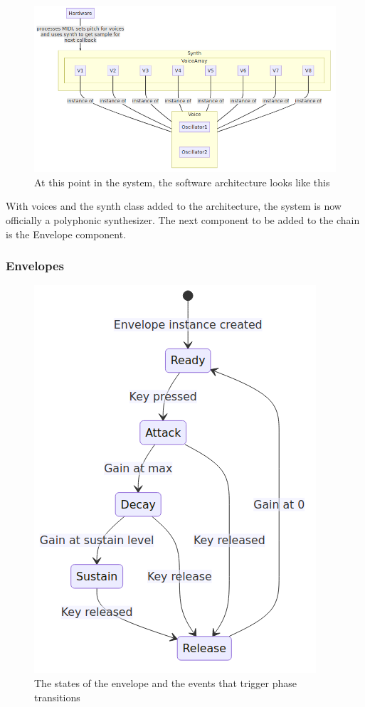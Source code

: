 \documentclass[acmlarge,screen]{acmart}
\begin{document}
	\begin{figure}[H]
		\includegraphics[width=\linewidth]{voice_graph_diagram}
		\caption{At this point in the system, the software architecture looks like this}
		\centering
	\end{figure}
	
	With voices and the synth class added to the architecture, the system is now officially a polyphonic synthesizer. The next component to be added to the chain is the Envelope component.


	\subsubsection{Envelopes}
	
	\begin{figure}
		\centering
		\caption{The states of the envelope and the events that trigger phase transitions}
		\includegraphics[width=.8\linewidth]{envelope_state_diagram}
	\end{figure}
	
\end{document}
